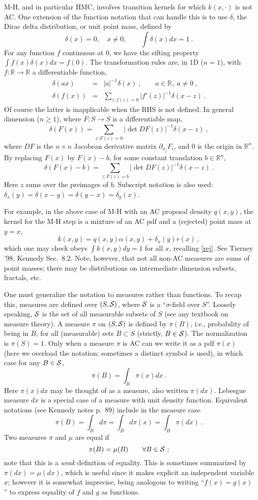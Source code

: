 \documentclass[10pt]{article}
\newcommand{\be}{\begin{equation}}
\newcommand{\ee}{\end{equation}}
\newcommand{\bea}{\begin{eqnarray}}
\newcommand{\eea}{\end{eqnarray}}
\newcommand{\R}{\mathbb{R}}
\newcommand{\al}{\alpha}
\begin{document}
M-H, and in particular HMC,
involves transition kernels for which $k(x,\cdot)$
is not AC.
One extension of the function notation that can handle
this is to use $\delta$, the Dirac delta distribution, or unit point mass, defined by
$$
\delta(x) = 0, \quad x\neq 0, \qquad \int \delta(x) dx = 1~.
$$
For any function $f$ continuous at $0$, we have the sifting property
$\int f(x) \delta(x) dx = f(0)$.
The transformation rules are, in 1D ($n=1$), with $f:\R \to \R$ a
differentiable function,
\bea
\delta(ax) &=& |a|^{-1} \delta(x)~, \qquad a \in \R, \; a\neq 0~,
\\
\delta(f(x)) &=& \sum_{z: f(z) = 0} |f'(z)|^{-1} \delta(x-z)~.
\eea
Of course the latter is inapplicable when the RHS is not defined.
In general dimension ($n\ge 1$), where $F:S\to S$ is a differentiable map,
\be
\delta(F(x)) = \sum_{z: F(z) = 0} |\det DF(z)|^{-1} \delta(x-z)~,
\ee
where $DF$ is the $n\times n$ Jacobean derivative matrix $\partial_{x_j} F_i$,
and $0$ is the origin in $\R^n$.
By replacing $F(x)$ by $F(x)-b$, for some constant translation $b\in \R^n$,
\be
\delta(F(x)-b) = \sum_{z: F(z) = b} |\det DF(z)|^{-1} \delta(x-z)~.
\label{deltarule}
\ee
Here $z$ sums over the preimages of $b$.
Subscript notation is also used:
$\delta_x(y) = \delta(x-y) = \delta(y-x) = \delta_y(x)$.

For example, in the above case of M-H with an AC proposal density
$q(x,y)$, the kernel for the M-H step
is a mixture of an AC pdf and a (rejected) point mass at $y=x$,
\be
k(x,y) = q(x,y)\al(x,y) + \delta_x(y) r(x)~,
\label{mhker}
\ee
which one may check obeys $\int k(x,y) dy=1$ for all $x$,
recalling \eqref{rej}.
See Tierney '98, Kennedy Sec.~8.2.
Note, however, that not all non-AC measures are sums of point masses;
there may be distributions on intermediate dimension subsets, fractals, etc.

One must generalize the notation to measures rather than
functions.
To recap this,
measures are defined over $(S,\cal S)$, where $\cal S$ is a
``$\sigma$-field over $S$''.
Loosely speaking, $\cal S$ is the set of all measurable
subsets of $S$ (see any textbook on measure theory).
A measure $\pi$ on $(S,\cal S)$ is defined by
$\pi(B)$, i.e., probability of being in $B$,
for all (measurable) sets $B\subset S$ (strictly, $B\in \cal S$).
The normalization is $\pi(S) = 1$.
Only when a measure $\pi$ is AC
can we write it as a pdf $\pi(x)$
(here we overload the notation; sometimes a distinct symbol is used),
in which case for any $B\in\cal S$,
$$
\pi(B) = \int_B \pi(x) dx~.
$$
Here $\pi(x) dx$ may be thought of as a measure, also written
$\pi(dx)$.
Lebesgue measure $dx$ is a special case of a measure with unit density function.
Equivalent notations (see Kennedy notes p.~89) include in the measure case
$$
\pi(B) = \int_B d\pi = \int_B d\pi(x) = \int_B \pi(dx) ~.
$$
Two measures $\pi$ and $\mu$ are equal if
$$
\pi(B) = \mu(B) \qquad \forall B\in\cal S~;
$$
note that this is a {\em weak} definition of equality.
This is sometimes summarized by $\pi(dx) = \mu(dx)$, which
is useful since it makes explicit an independent variable $x$;
however it is somewhat imprecise, being analogous to
writing ``$f(x) = g(x)$'' to express equality of $f$ and $g$ as functions.
\end{document}

